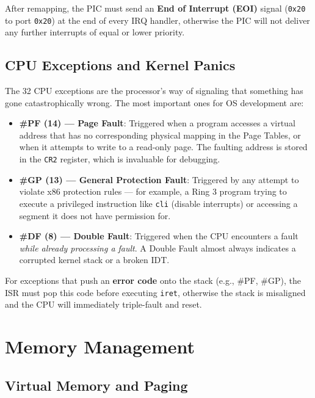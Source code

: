 \documentclass[12pt,a4paper]{report}
\begin{document}
After remapping, the PIC must send an \textbf{End of Interrupt (EOI)} signal
(\texttt{0x20} to port \texttt{0x20}) at the end of every IRQ handler, otherwise the
PIC will not deliver any further interrupts of equal or lower priority.

\section{CPU Exceptions and Kernel Panics}

The 32 CPU exceptions are the processor's way of signaling that something has gone
catastrophically wrong. The most important ones for OS development are:

\begin{itemize}
    \item \textbf{\#PF (14) --- Page Fault}: Triggered when a program accesses a virtual
    address that has no corresponding physical mapping in the Page Tables, or when it
    attempts to write to a read-only page. The faulting address is stored in the
    \texttt{CR2} register, which is invaluable for debugging.
    \item \textbf{\#GP (13) --- General Protection Fault}: Triggered by any attempt to
    violate x86 protection rules --- for example, a Ring 3 program trying to execute a
    privileged instruction like \texttt{cli} (disable interrupts) or accessing a
    segment it does not have permission for.
    \item \textbf{\#DF (8) --- Double Fault}: Triggered when the CPU encounters a fault
    \textit{while already processing a fault}. A Double Fault almost always indicates a
    corrupted kernel stack or a broken IDT.
\end{itemize}

For exceptions that push an \textbf{error code} onto the stack (e.g., \#PF, \#GP),
the ISR must pop this code before executing \texttt{iret}, otherwise the stack is
misaligned and the CPU will immediately triple-fault and reset.

\newpage

\chapter{Memory Management}

\section{Virtual Memory and Paging}
\end{document}
